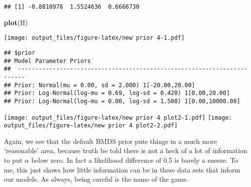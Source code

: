 \documentclass[]{article}
\newenvironment{Shaded}{\begin{snugshade}}{\end{snugshade}}
\newcommand{\KeywordTok}[1]{\textcolor[rgb]{0.13,0.29,0.53}{\textbf{#1}}}
\newcommand{\NormalTok}[1]{#1}
\newcommand{\OperatorTok}[1]{\textcolor[rgb]{0.81,0.36,0.00}{\textbf{#1}}}
\begin{document}
\begin{verbatim}
## [1] -0.8810978  1.5524636  0.6666730
\end{verbatim}

\begin{Shaded}
\begin{Highlighting}[]
\KeywordTok{plot}\NormalTok{(H)}
\end{Highlighting}
\end{Shaded}

\texttt{[image: output\_files/figure-latex/new prior 4-1.pdf]}

\begin{Shaded}
\end{Shaded}

\begin{verbatim}
## $prior
## Model Parameter Priors
##  ------------------------------------------------------------------------
## Prior: Normal(mu = 0.00, sd = 2.000) 1[-20.00,20.00]
## Prior: Log-Normal(log-mu = 0.69, log-sd = 0.420) 1[0.00,20.00]
## Prior: Log-Normal(log-mu = 0.00, log-sd = 1.500) 1[0.00,10000.00]
\end{verbatim}

\texttt{[image: output\_files/figure-latex/new prior 4 plot2-1.pdf]}
\texttt{[image: output\_files/figure-latex/new prior 4 plot2-2.pdf]}

Again, we see that the default BMDS prior puts things in a much more
`reasonable' area, because truth be told there is not a heck of a lot of
information to put \(\alpha\) below zero. In fact a likelihood
difference of 0.5 is barely a sneeze. To me, this just shows how little
information can be in these data sets that inform our models. As always,
being careful is the name of the game.
\end{document}
